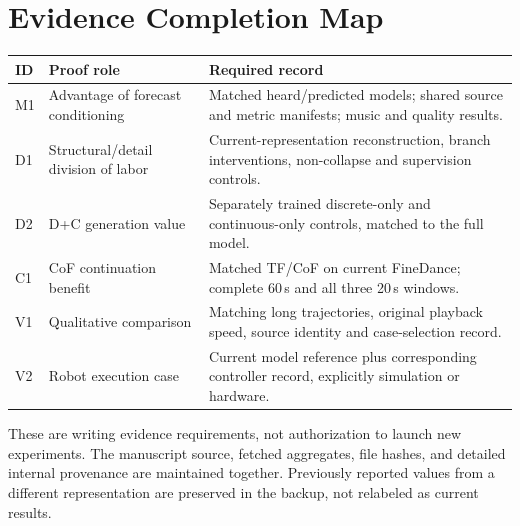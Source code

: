 \section{Evidence Completion Map}
\begin{center}\small
\begin{tabular}{@{}p{}p{}p{}@{}}\toprule
ID & Proof role & Required record\\\midrule
M1 & Advantage of forecast conditioning & Matched heard/predicted models; shared source and metric manifests; music and quality results.\\
D1 & Structural/detail division of labor & Current-representation reconstruction, branch interventions, non-collapse and supervision controls.\\
D2 & D+C generation value & Separately trained discrete-only and continuous-only controls, matched to the full model.\\
C1 & CoF continuation benefit & Matched TF/CoF on current FineDance; complete 60\,s and all three 20\,s windows.\\
V1 & Qualitative comparison & Matching long trajectories, original playback speed, source identity and case-selection record.\\
V2 & Robot execution case & Current model reference plus corresponding controller record, explicitly simulation or hardware.\\\bottomrule
\end{tabular}
\end{center}
These are writing evidence requirements, not authorization to launch new experiments. The manuscript source, fetched aggregates, file hashes, and detailed internal provenance are maintained together. Previously reported values from a different representation are preserved in the backup, not relabeled as current results.
